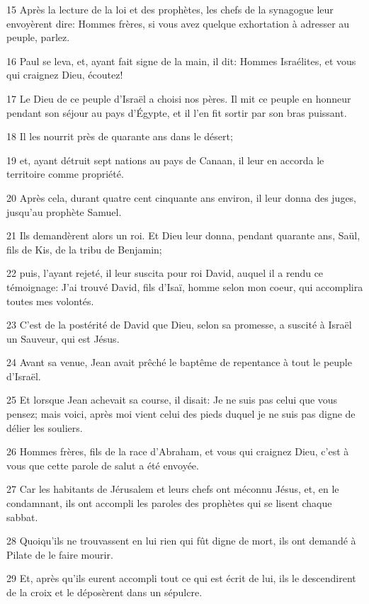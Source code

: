\par 15 Après la lecture de la loi et des prophètes, les chefs de la synagogue leur envoyèrent dire: Hommes frères, si vous avez quelque exhortation à adresser au peuple, parlez.
\par 16 Paul se leva, et, ayant fait signe de la main, il dit: Hommes Israélites, et vous qui craignez Dieu, écoutez!
\par 17 Le Dieu de ce peuple d'Israël a choisi nos pères. Il mit ce peuple en honneur pendant son séjour au pays d'Égypte, et il l'en fit sortir par son bras puissant.
\par 18 Il les nourrit près de quarante ans dans le désert;
\par 19 et, ayant détruit sept nations au pays de Canaan, il leur en accorda le territoire comme propriété.
\par 20 Après cela, durant quatre cent cinquante ans environ, il leur donna des juges, jusqu'au prophète Samuel.
\par 21 Ils demandèrent alors un roi. Et Dieu leur donna, pendant quarante ans, Saül, fils de Kis, de la tribu de Benjamin;
\par 22 puis, l'ayant rejeté, il leur suscita pour roi David, auquel il a rendu ce témoignage: J'ai trouvé David, fils d'Isaï, homme selon mon coeur, qui accomplira toutes mes volontés.
\par 23 C'est de la postérité de David que Dieu, selon sa promesse, a suscité à Israël un Sauveur, qui est Jésus.
\par 24 Avant sa venue, Jean avait prêché le baptême de repentance à tout le peuple d'Israël.
\par 25 Et lorsque Jean achevait sa course, il disait: Je ne suis pas celui que vous pensez; mais voici, après moi vient celui des pieds duquel je ne suis pas digne de délier les souliers.
\par 26 Hommes frères, fils de la race d'Abraham, et vous qui craignez Dieu, c'est à vous que cette parole de salut a été envoyée.
\par 27 Car les habitants de Jérusalem et leurs chefs ont méconnu Jésus, et, en le condamnant, ils ont accompli les paroles des prophètes qui se lisent chaque sabbat.
\par 28 Quoiqu'ils ne trouvassent en lui rien qui fût digne de mort, ils ont demandé à Pilate de le faire mourir.
\par 29 Et, après qu'ils eurent accompli tout ce qui est écrit de lui, ils le descendirent de la croix et le déposèrent dans un sépulcre.
